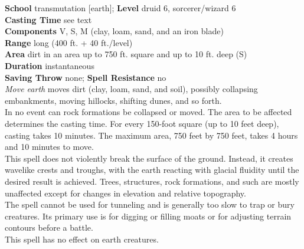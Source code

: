 \textbf{School} transmutation [earth]; \textbf{Level} druid 6, sorcerer/wizard 6\\
\textbf{Casting Time} see text\\
\textbf{Components} V, S, M (clay, loam, sand, and an iron blade)\\
\textbf{Range} long (400 ft. + 40 ft./level)\\
\textbf{Area} dirt in an area up to 750 ft. square and up to 10 ft. deep (S)\\
\textbf{Duration} instantaneous\\
\textbf{Saving Throw} none; \textbf{Spell Resistance} no\\
\textit{Move earth }moves dirt (clay, loam, sand, and soil), possibly collapsing embankments, moving hillocks, shifting dunes, and so forth.\\
In no event can rock formations be collapsed or moved. The area to be affected determines the casting time. For every 150-foot square (up to 10 feet deep), casting takes 10 minutes. The maximum area, 750 feet by 750 feet, takes 4 hours and 10 minutes to move.\\
This spell does not violently break the surface of the ground. Instead, it creates wavelike crests and troughs, with the earth reacting with glacial fluidity until the desired result is achieved. Trees, structures, rock formations, and such are mostly unaffected except for changes in elevation and relative topography.\\
The spell cannot be used for tunneling and is generally too slow to trap or bury creatures. Its primary use is for digging or filling moats or for adjusting terrain contours before a battle.\\
This spell has no effect on earth creatures.\\
